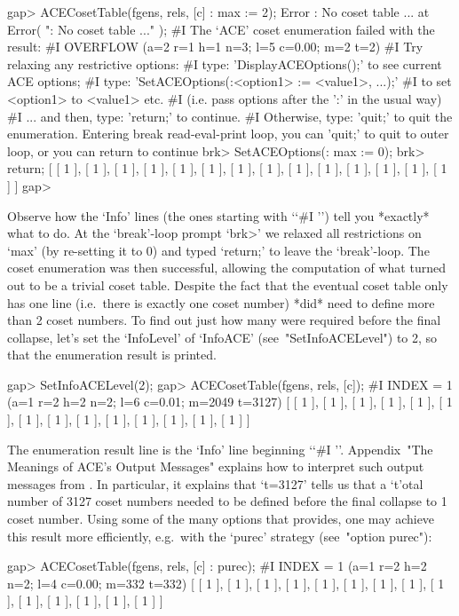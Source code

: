 \beginexample
gap> ACECosetTable(fgens, rels, [c] : max := 2);
Error : No coset table ... at
Error( ": No coset table ..." );
#I  The `ACE' coset enumeration failed with the result:
#I  OVERFLOW (a=2 r=1 h=1 n=3; l=5 c=0.00; m=2 t=2)
#I  Try relaxing any restrictive options:
#I  type: 'DisplayACEOptions();' to see current ACE options;
#I  type: 'SetACEOptions(:<option1> := <value1>, ...);'
#I  to set <option1> to <value1> etc.
#I  (i.e. pass options after the ':' in the usual way)
#I  ... and then, type: 'return;' to continue.
#I  Otherwise, type: 'quit;' to quit the enumeration.
Entering break read-eval-print loop, you can 'quit;' to quit to outer loop,
or you can return to continue
brk> SetACEOptions(: max := 0);
brk> return;
[ [ 1 ], [ 1 ], [ 1 ], [ 1 ], [ 1 ], [ 1 ], [ 1 ], [ 1 ], [ 1 ], [ 1 ], 
  [ 1 ], [ 1 ], [ 1 ], [ 1 ] ]
gap>
\endexample

Observe how the `Info' lines (the  ones  starting  with  \lq{}`\#I '')
tell you *exactly* what to do. At the `break'-loop  prompt  `brk>'  we
relaxed all restrictions on `max' (by re-setting it to  0)  and  typed
`return;' to leave the `break'-loop. The coset  enumeration  was  then
successful, allowing the computation  of  what  turned  out  to  be  a
trivial coset table. Despite the fact that the  eventual  coset  table
only has one line (i.e.~there is  exactly  one  coset  number)  {\ACE}
*did* need to define more than 2 coset numbers. To find out  just  how
many  were  required  before  the  final  collapse,  let's   set   the
`InfoLevel' of `InfoACE' (see~"SetInfoACELevel") to  2,  so  that  the
{\ACE} enumeration result is printed.

\beginexample
gap> SetInfoACELevel(2);
gap> ACECosetTable(fgens, rels, [c]);
#I  INDEX = 1 (a=1 r=2 h=2 n=2; l=6 c=0.01; m=2049 t=3127)
[ [ 1 ], [ 1 ], [ 1 ], [ 1 ], [ 1 ], [ 1 ], [ 1 ], [ 1 ], [ 1 ], [ 1 ], 
  [ 1 ], [ 1 ], [ 1 ], [ 1 ] ]
\endexample

The enumeration result line is the `Info' line beginning \lq{}`\#I ''.
Appendix~"The Meanings of  ACE's  Output  Messages"  explains  how  to
interpret such output messages from {\ACE}. In particular, it explains
that `t=3127' tells us that a `t'otal number  of  3127  coset  numbers
needed to be defined before the final  collapse  to  1  coset  number.
Using some of the many options that {\ACE} provides, one  may  achieve
this  result  more  efficiently,  e.g.~with   the   `purec'   strategy
(see~"option purec"):

\beginexample
gap> ACECosetTable(fgens, rels, [c] : purec);
#I  INDEX = 1 (a=1 r=2 h=2 n=2; l=4 c=0.00; m=332 t=332)
[ [ 1 ], [ 1 ], [ 1 ], [ 1 ], [ 1 ], [ 1 ], [ 1 ], [ 1 ], [ 1 ], [ 1 ], 
  [ 1 ], [ 1 ], [ 1 ], [ 1 ] ]
\endexample

